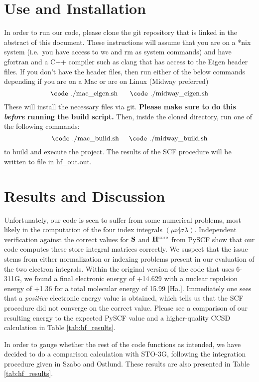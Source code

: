 \documentclass[%
 aip,
 amsmath,amssymb,
 reprint,%
]{revtex4-1}
\begin{document}
\section{Use and Installation}
In order to run our code, please clone the git repository that is linked in
the abstract of this document. These instructions will assume that you are
 on a *nix system (i.e.\ you have access to {\code wc} and {\code rm} as
 system commands) and have {\code gfortran} and a C++ compiler such as 
 {\code clang} that has access to the Eigen header files. If you don't
have the header files,  then run either of the below commands depending if you
are on a Mac or are on Linux (Midway preferred)
$$ \text{{\code ./mac\_eigen.sh} \hspace{0.5cm}{\code ./midway\_eigen.sh}}$$
These will install the necessary files via git.  \textbf{Please make sure to
do this \emph{before} running the build script.} Then, inside the cloned
directory, run one of the following commands: 
%
$$ \text{{\code ./mac\_build.sh}} \hspace{0.5cm}
 \text{{\code ./midway\_build.sh}} $$
to build and execute the project. The results of the SCF procedure will be
 written to file in {\code hf\_out.out}.

\section{Results and Discussion}
Unfortunately, our code is seen to suffer from some numerical problems, most
likely in the computation of the four index integrals $\left(\mu\nu |
\sigma\lambda\right)$. Independent verification against the correct values for
$\bold{S}$ and $\bold{H}^{\text{core}}$ from PySCF show that our code computes
these store integral matrices correctly.  We suspect that the issue stems from
either normalization or indexing problems present in our evaluation of the two
electron integrals.  Within the original version of the code that uses 6-311G,
we found a final electronic energy of +14.629 with a nuclear repulsion energy
of +1.36
for a total molecular energy of 15.99 [Ha.]. Immediately one sees that a
\emph{positive} electronic energy value is obtained, which tells us that the
SCF procedure did not converge on the correct value. Please see a comparison of our
resulting energy to the expected PySCF value and a higher-quality CCSD
calculation  in Table \ref{tab:hf_results}. 

In order to gauge whether the rest of the code functions as intended, we have
decided to do a comparison calculation with STO-3G, following the integration
procedure given in Szabo and Ostlund\cite{szabo2012modern}. These results are
also presented in Table \ref{tab:hf_results}.
\end{document}
